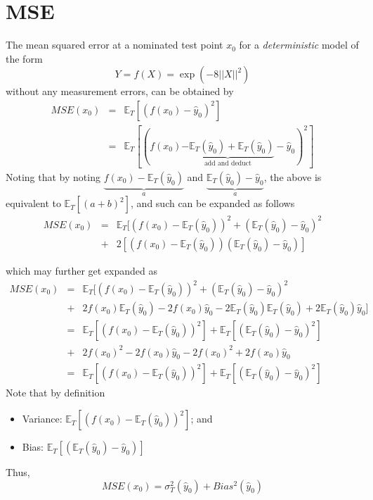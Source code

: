 \documentclass{beamer}
\newcommand{\E}{\mathbb{E}}
\begin{document}
\section{MSE}
\begin{frame}
The mean squared error at a nominated test point $x_0$ for a \textit{deterministic} model of the form
\[
Y=f(X)=\exp(-8\lvert\lvert X\rvert\rvert^2)
\]
without any measurement errors, can be obtained by
\begin{eqnarray*}
MSE(x_0)&=&\E_{T}[(f(x_0)-\hat{y}_0)^2]\\
&=&\E_{T}[(f(x_0)\underbrace{-\E_T(\hat{y}_0)+\E_T(\hat{y}_0)}_{\text{add and deduct}}-\hat{y}_0)^2]
\end{eqnarray*}
Noting that by noting $\underbrace{f(x_0)-\E_T(\hat{y}_0)}_{a}$ and $\underbrace{\E_T(\hat{y}_0)-\hat{y}_0}_{a}$, the above is equivalent to $\E_T[(a+b)^2]$, and such can be expanded as follows
\begin{eqnarray*}
MSE(x_0)&=&\E_{T}[(f(x_0)-\E_T(\hat{y}_0))^2+(\E_T(\hat{y}_0)-\hat{y}_0)^2\\
&+&2[(f(x_0)-\E_T(\hat{y}_0))(\E_T(\hat{y}_0)-\hat{y}_0)]
\end{eqnarray*}
\end{frame}

\begin{frame}
which may further get expanded as
\begin{eqnarray*}
MSE(x_0)&=&\E_{T}[(f(x_0)-\E_T(\hat{y}_0))^2+(\E_T(\hat{y}_0)-\hat{y}_0)^2\\
&+&2f(x_0)\E_T(\hat{y}_0)-2f(x_0)\hat{y}_0-2\E_T(\hat{y}_0)\E_T(\hat{y}_0)+2\E_T(\hat{y}_0)\hat{y}_0]\\
&=&\E_{T}[(f(x_0)-\E_T(\hat{y}_0))^2]+\E_T[(\E_T(\hat{y}_0)-\hat{y}_0)^2]\\
&+&2f(x_0)^2-2f(x_0)\hat{y}_0-2f(x_0)^2+2f(x_0)\hat{y}_0\\
&=&\E_{T}[(f(x_0)-\E_T(\hat{y}_0))^2]+\E_T[(\E_T(\hat{y}_0)-\hat{y}_0)^2]
\end{eqnarray*}
Note that by definition
\begin{itemize}
\item{} Variance: $\E_{T}[(f(x_0)-\E_T(\hat{y}_0))^2]$; and
\item{} Bias: $\E_T[(\E_T(\hat{y}_0)-\hat{y}_0)]$
\end{itemize}
Thus,
\begin{equation}
MSE(x_0)=\sigma^2_T(\hat{y}_0)+Bias^2(\hat{y}_0)
\end{equation}
\end{frame}
\end{document}
